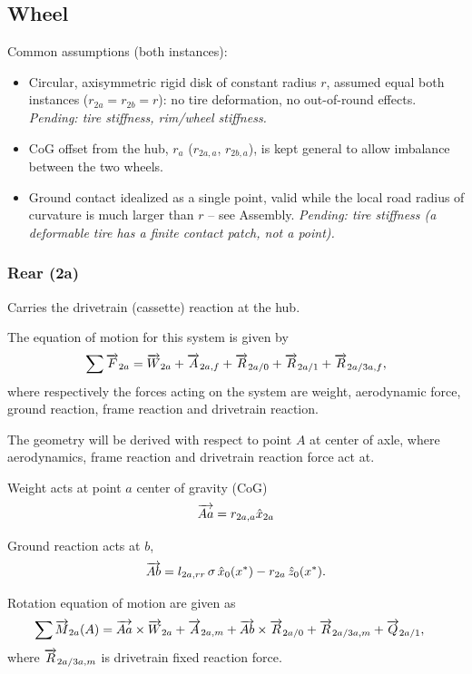 \subsection{Wheel}
\label{sec:wheel}

Common assumptions (both instances):
\begin{itemize}
    \item Circular, axisymmetric rigid disk of constant radius $r$, assumed equal both instances ($r_{2a}=r_{2b}=r$): no tire deformation, no out-of-round effects. \emph{Pending: tire stiffness, rim/wheel stiffness.}
    \item CoG offset from the hub, $r_a$ ($r_{2a,a}$, $r_{2b,a}$), is kept general to allow imbalance between the two wheels.
    \item Ground contact idealized as a single point, valid while the local road radius of curvature is much larger than $r$ -- see Assembly. \emph{Pending: tire stiffness (a deformable tire has a finite contact patch, not a point).}
\end{itemize}

\subsubsection{Rear (2a)}
Carries the drivetrain (cassette) reaction at the hub.

The equation of motion for this system is given by
\begin{equation}
    \sum \overrightarrow{F}_{2a} = \overrightarrow{W}_{2a} + \overrightarrow{A}_{2a,f} + \overrightarrow{R}_{2a/0} + \overrightarrow{R}_{2a/1} + \overrightarrow{R}_{2a/3a, f},
\end{equation}
where respectively the forces acting on the system are weight, aerodynamic force, ground reaction, frame reaction and drivetrain reaction.

The geometry will be derived with respect to point $A$ at center of axle, where aerodynamics, frame reaction and drivetrain reaction force act at.

Weight acts at point $a$ center of gravity (CoG)
\begin{equation}
    \overrightarrow{Aa} = r_{2a,a}\hat{x}_{2a}
\end{equation}

Ground reaction acts at $b$,
\begin{equation}
    \overrightarrow{Ab} = l_{2a,rr}\,\sigma\,\hat x_0(x^*) - r_{2a}\,\hat z_0(x^*).
\end{equation}

Rotation equation of motion are given as
\begin{align}
    \sum \overrightarrow{M}_{2a}(A) &= \overrightarrow{Aa} \times \overrightarrow{W}_{2a} + \overrightarrow{A}_{2a,m} + \overrightarrow{Ab} \times \overrightarrow{R}_{2a/0} + \overrightarrow{R}_{2a/3a, m} + \overrightarrow{Q}_{2a/1},
\end{align}
where $\overrightarrow{R}_{2a/3a, m}$ is drivetrain fixed reaction force.

